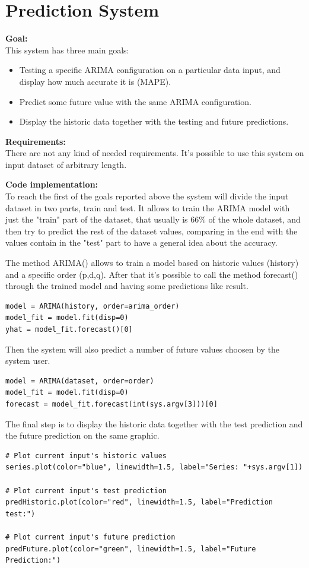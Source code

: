  
 
\newpage
\section{Prediction System}
\textbf{Goal:}\\ 
This system has three main goals:
\vspace{-5mm}
\begin{itemize}
 \setlength{\itemsep}{-5pt} 
\item Testing a specific ARIMA configuration on a particular data input, and display how much accurate it is (MAPE).
\item Predict some future value with the same ARIMA configuration.
\item Display the historic data together with the testing and future predictions.
\end{itemize}

\textbf{Requirements:}\\
There are not any kind of needed requirements. It's possible to use this system on input dataset of arbitrary length.


\textbf{Code implementation:}\\
To reach the first of the goals reported above the system will divide the input dataset in two parts, train and test. It allows to train the ARIMA model with just the "train" part of the dataset, that usually is 66\% of the whole dataset, and then try to predict the rest of the dataset values, comparing in the end with the values contain in the "test" part to have a general idea about the accuracy.

The method ARIMA() allows to train a model based on historic values (history) and a specific order (p,d,q). After that it's possible to call the method forecast() through the trained model and having some predictions like result.

\begin{lstlisting}
model = ARIMA(history, order=arima_order)
model_fit = model.fit(disp=0)
yhat = model_fit.forecast()[0]
\end{lstlisting}

Then the system will also predict a number of future values choosen by the system user.
\begin{lstlisting}
model = ARIMA(dataset, order=order)
model_fit = model.fit(disp=0)
forecast = model_fit.forecast(int(sys.argv[3]))[0]
\end{lstlisting}

The final step is to display the historic data together with the test prediction and the future prediction on the same graphic. 
\begin{lstlisting}
# Plot current input's historic values 
series.plot(color="blue", linewidth=1.5, label="Series: "+sys.argv[1])

# Plot current input's test prediction
predHistoric.plot(color="red", linewidth=1.5, label="Prediction test:")

# Plot current input's future prediction
predFuture.plot(color="green", linewidth=1.5, label="Future Prediction:")
\end{lstlisting}

